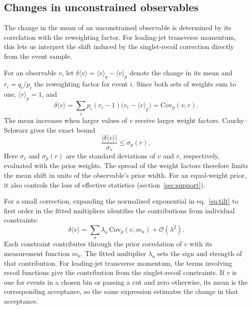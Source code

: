 \subsection{Changes in unconstrained observables}
\label{sec:transport}

The change in the mean of an unconstrained observable is determined by its correlation with the reweighting factor. For leading-jet transverse momentum, this lets us interpret the shift induced by the singlet-recoil correction directly from the event sample.

For an observable $v$, let $\delta\langle v\rangle=\langle v\rangle_q-\langle v\rangle_p$ denote the change in its mean and $r_i=q_i/p_i$ the reweighting factor for event $i$. Since both sets of weights sum to one, $\langle r\rangle_p=1$, and
\begin{equation}
\delta\langle v\rangle
=\sum_i p_i(r_i-1)\big(v_i-\langle v\rangle_p\big)
=\mathrm{Cov}_p(v,r).
\label{eq:meanchange}
\end{equation}
The mean increases when larger values of $v$ receive larger weight factors. Cauchy--Schwarz gives the exact bound
\begin{equation}
\frac{|\delta\langle v\rangle|}{\sigma_v}
\leq \sigma_p(r),
\label{eq:costbound}
\end{equation}
Here $\sigma_v$ and $\sigma_p(r)$ are the standard deviations of $v$ and $r$, respectively, evaluated with the prior weights. The spread of the weight factors therefore limits the mean shift in units of the observable's prior width. For an equal-weight prior, it also controls the loss of effective statistics (section~\ref{sec:support}).

For a small correction, expanding the normalized exponential in eq.~\eqref{eq:tilt} to first order in the fitted multipliers identifies the contributions from individual constraints:
\begin{equation}
\delta\langle v\rangle
=\sum_a\lambda_a\,\mathrm{Cov}_p(v,m_a)
+\mathcal{O}(\lambda^2).
\label{eq:transport}
\end{equation}
Each constraint contributes through the prior correlation of $v$ with its measurement function $m_a$. The fitted multiplier $\lambda_a$ sets the sign and strength of that contribution. For leading-jet transverse momentum, the terms involving recoil functions give the contribution from the singlet-recoil constraints. If $v$ is one for events in a chosen bin or passing a cut and zero otherwise, its mean is the corresponding acceptance, so the same expression estimates the change in that acceptance.


